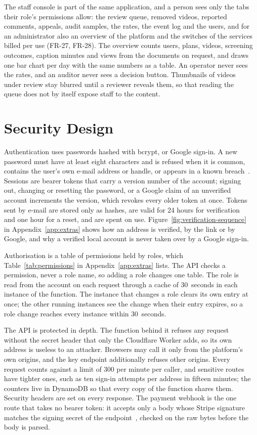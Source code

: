 The staff console is part of the same application, and a person sees only the tabs their role's
permissions allow: the review queue, removed videos, reported comments, appeals, audit samples,
the rates, the event log and the users, and for an administrator also an overview of the platform
and the switches of the services billed per use (FR-27, FR-28). The overview counts users, plans,
videos, screening outcomes, caption minutes and views from the documents on request, and draws one
bar chart per day with the same numbers as a table. An operator never sees the rates, and an auditor never sees
a decision button. Thumbnails of videos under review stay blurred until a reviewer reveals them, so
that reading the queue does not by itself expose staff to the content.

\section{Security Design}
\label{sec:security-design}

Authentication uses passwords hashed with bcrypt, or Google sign-in. A new password must have at
least eight characters and is refused when it is common, contains the user's own e-mail address or
handle, or appears in a known breach~\cite{nist80063b}. Sessions are bearer tokens that carry a
version number of the account; signing out, changing or resetting the password, or a Google claim of
an unverified account increments the version, which revokes every older token at once. Tokens sent by
e-mail are stored only as hashes, are valid for 24 hours for verification and one hour for a reset,
and are spent on use. Figure~\ref{fig:verification-sequence} in
Appendix~\ref{app:extras} shows how an address is verified, by the
link or by Google, and why a verified local account is never taken over by a Google sign-in.

Authorisation is a table of permissions held by roles, which Table~\ref{tab:permissions} in Appendix~\ref{app:extras} lists. The
API checks a permission, never a role name, so adding a role changes one table. The role is read
from the account on each request through a cache of 30~seconds in each instance of the function. The
instance that changes a role clears its own entry at once; the other running instances see the
change when their entry expires, so a role change reaches every instance within 30~seconds.

The API is protected in depth. The function behind it refuses any request without the secret header
that only the Cloudflare Worker adds, so its own address is useless to an attacker. Browsers may call
it only from the platform's own origins, and the key endpoint additionally refuses other origins.
Every request counts against a limit of 300 per minute per caller, and sensitive routes have tighter
ones, such as ten sign-in attempts per address in fifteen minutes; the counters live in DynamoDB so
that every copy of the function shares them. Security headers are set on every response. The payment
webhook is the one route that takes no bearer token: it accepts only a body whose Stripe signature
matches the signing secret of the endpoint~\cite{stripewebhooks}, checked on the raw bytes before the
body is parsed.

